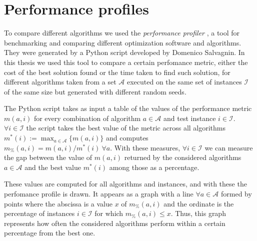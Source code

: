 \section{Performance profiles}

To compare different algorithms we used the \textit{performance profiler} \cite{Dolan2002}, a tool for benchmarking and comparing different optimization software and algorithms. They were generated by a Python script developed by Domenico Salvagnin. In this thesis we used this tool to compare a certain perfomance metric, either the cost of the best solution found or the time taken to find such solution, for different algorithms taken from a set $\mathcal{A}$ executed on the same set of instances $\mathcal{I}$ of the same size but generated with different random seeds.

The Python script takes as input a table of the values of the performance metric $m(a,i)$ for every combination of algorithm $a\in \mathcal{A}$ and test instance $i\in \mathcal{I}$. $\forall i\in \mathcal{I}$ the script takes the best value of the metric across all algorithms $m^*(i):=\max_{a\in\mathcal{A}}\{m(a,i)\}$ and computes $m_\%(a,i)=m(a,i)/m^*(i) \ \forall a$. With these measures, $\forall i\in \mathcal{I}$ we can measure the gap between the value of $m(a,i)$ returned by the considered algorithms $a\in\mathcal{A}$ and the best value $m^*(i)$ among those as a percentage.

These values are computed for all algorithms and instances, and with these the perfomance profile is drawn. It appears as a graph with a line $\forall a\in\mathcal{A}$ formed by points where the abscissa is a value $x$ of $m_\%(a,i)$ and the ordinate is the percentage of instances $i\in\mathcal{I}$ for which $m_\%(a,i)\leq x$. Thus, this graph represents how often the considered algorithms perform within a certain percentage from the best one.